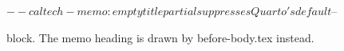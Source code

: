 $-- caltech-memo: empty title partial suppresses Quarto's default
$-- \maketitle block. The memo heading is drawn by before-body.tex instead.
